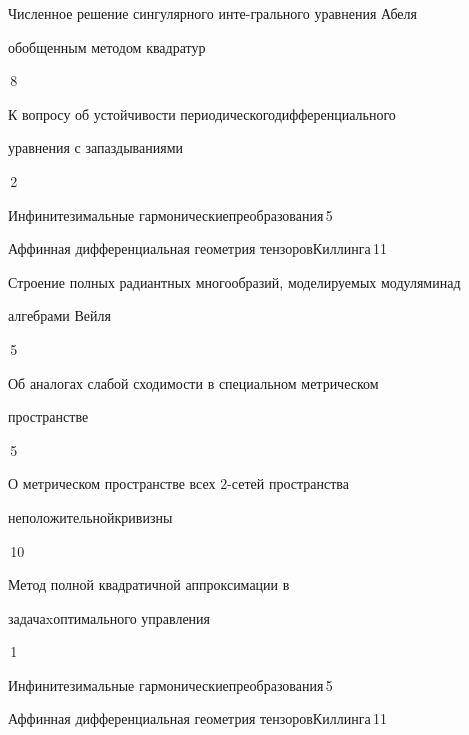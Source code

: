 

{Численное решение сингулярного инте-\newline грального уравнения Абеля


обобщенным методом квадратур}{\No\,8}




{К вопросу об устойчивости периодического\newline дифференциального


уравнения с запаздываниями}{\No\,2}




{Инфинитезимальные гармонические\newline преобразования}{\No\,5}




{Аффинная дифференциальная геометрия тензоров\newline Киллинга}{\No\,11}




{Строение полных радиантных многообразий, моделируемых модулями\newline над


алгебрами Вейля}{\No\,5}




{Об аналогах слабой сходимости в специальном метрическом


пространстве}{\No\,5}




{О метрическом пространстве всех $2$-сетей пространства


неположительной\newline кривизны}{\No\,10}




{Метод полной квадратичной аппроксимации в


задачаx\newline оптимального управления}{\No\,1}




{Инфинитезимальные гармонические\newline преобразования}{\No\,5}




{Аффинная дифференциальная геометрия тензоров\newline Киллинга}{\No\,11}


